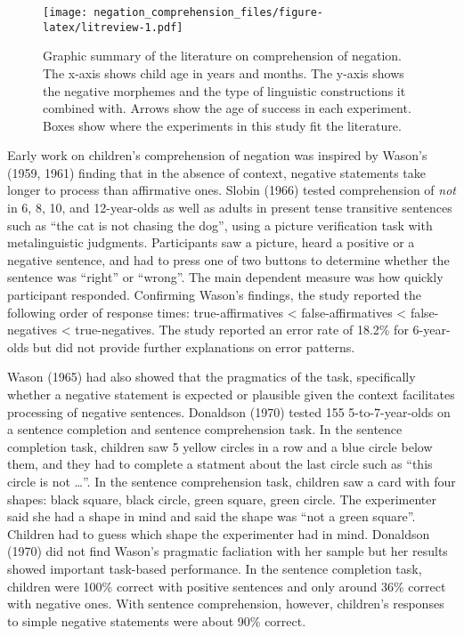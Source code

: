 \documentclass[man,floatsintext]{apa6}
\begin{document}
\begin{figure}
\centering
\texttt{[image: negation\_comprehension\_files/figure-latex/litreview-1.pdf]}
\caption{\label{fig:litreview}Graphic summary of the literature on comprehension of negation. The x-axis shows child age in years and months. The y-axis shows the negative morphemes and the type of linguistic constructions it combined with. Arrows show the age of success in each experiment. Boxes show where the experiments in this study fit the literature.}
\end{figure}

Early work on children's comprehension of negation was inspired by Wason's (1959, 1961) finding that in the absence of context, negative statements take longer to process than affirmative ones. Slobin (1966) tested comprehension of \emph{not} in 6, 8, 10, and 12-year-olds as well as adults in present tense transitive sentences such as \enquote{the cat is not chasing the dog}, using a picture verification task with metalinguistic judgments. Participants saw a picture, heard a positive or a negative sentence, and had to press one of two buttons to determine whether the sentence was \enquote{right} or \enquote{wrong}. The main dependent measure was how quickly participant responded. Confirming Wason's findings, the study reported the following order of response times: true-affirmatives \textless{} false-affirmatives \textless{} false-negatives \textless{} true-negatives. The study reported an error rate of 18.2\% for 6-year-olds but did not provide further explanations on error patterns.

Wason (1965) had also showed that the pragmatics of the task, specifically whether a negative statement is expected or plausible given the context facilitates processing of negative sentences. Donaldson (1970) tested 155 5-to-7-year-olds on a sentence completion and sentence comprehension task. In the sentence completion task, children saw 5 yellow circles in a row and a blue circle below them, and they had to complete a statment about the last circle such as \enquote{this circle is not \ldots{}}. In the sentence comprehension task, children saw a card with four shapes: black square, black circle, green square, green circle. The experimenter said she had a shape in mind and said the shape was \enquote{not a green square}. Children had to guess which shape the experimenter had in mind. Donaldson (1970) did not find Wason's pragmatic facliation with her sample but her results showed important task-based performance. In the sentence completion task, children were 100\% correct with positive sentences and only around 36\% correct with negative ones. With sentence comprehension, however, children's responses to simple negative statements were about 90\% correct.
\end{document}
